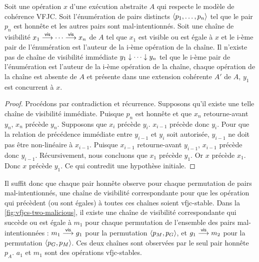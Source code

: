 \begin{proposition}
Soit une opération $x$ d'une exécution abstraite $A$ qui respecte le modèle de cohérence \ac{VFJC}.
Soit l'énumération de pairs distincts $\tuple*{p_1, \dotsc ,p_n}$ tel que le pair $p_n$ est honnête et les autres pairs sont mal-intentionnés.
Soit une chaîne de visibilité $x_1 \vis \dotsb \vis x_n$ de $A$ tel que $x_1$ est visible ou est égale à $x$ et le i-ème pair de l'énumération est l'auteur de la i-ème opération de la chaîne.
Il n'existe pas de chaîne de visibilité immédiate $y_1 \idr \dotsb \idr y_n$ tel que le i-ème pair de l'énumération est l'auteur de la i-ème opération de la chaîne, chaque opération de la chaîne est absente de $A$ et présente dans une extension cohérente $A'$ de $A$, $y_1$ est concurrent à $x$.
\end{proposition}

\begin{proof}
Procédons par contradiction et récurrence.
Supposons qu'il existe une telle chaîne de visibilité immédiate.
Puisque $p_n$ est honnête et que $x_n$ retourne-avant $y_n$, $x_n$ précède $y_n$.
Supposons que $x_i$ précède $y_i$.
$x_{i-1}$ précède donc $y_i$.
Pour que la relation de précédence immédiate entre $y_{i-1}$ et $y_i$ soit autorisée, $y_{i-1}$ ne doit pas être non-linéaire à $x_{i-1}$.
Puisque $x_{i-1}$ retourne-avant $y_{i-1}$, $x_{i-1}$ précède donc $y_{i-1}$.
Récursivement, nous concluons que $x_1$ précède $y_1$.
Or $x$ précède $x_1$.
Donc $x$ précède $y_1$.
Ce qui contredit une hypothèse initiale.
\end{proof}

Il suffit donc que chaque pair honnête observe pour chaque permutation de pairs mal-intentionnés, une chaîne de visibilité correspondante pour que les opération qui précèdent (ou sont égales) à toutes ces chaînes soient vfjc-stable.
Dans la \autoref{fig:vfjcs-two-malicious}, il existe une chaîne de visibilité correspondante qui succède ou est égale à $m_1$ pour chaque permutation de l'ensemble des pairs mal-intentionnées : $m_1 \vis g_1$ pour la permutation $\tuple*{p_M, p_G}$, et $g_1 \vis m_2$ pour la permutation $\tuple*{p_G, p_M}$.
Ces deux chaînes sont observées par le seul pair honnête $p_A$.
$a_1$ et $m_1$ sont des opérations vfjc-stables.

